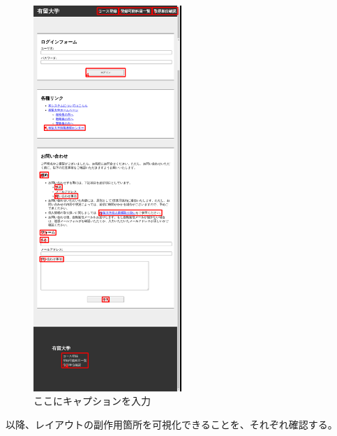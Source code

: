 \begin{figure}[htbp]
    \centering
    \includegraphics[width=0.5\textwidth]{image/5/test.png}
    \caption{ここにキャプションを入力}
    \label{fig:test}
\end{figure}
\par
以降、レイアウトの副作用箇所を可視化できることを、それぞれ確認する。


